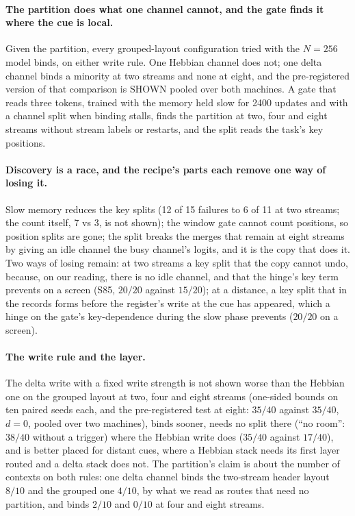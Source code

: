 \documentclass[11pt]{article}
\begin{document}
\paragraph{The partition does what one channel cannot, and the gate finds it where the cue is local.} Given the partition, every grouped-layout configuration tried with the $N = 256$ model binds, on either write rule. One Hebbian channel does not; one delta channel binds a minority at two streams and none at eight, and the pre-registered version of that comparison is SHOWN pooled over both machines. A gate that reads three tokens, trained with the memory held slow for 2400 updates and with a channel split when binding stalls, finds the partition at two, four and eight streams without stream labels or restarts, and the split reads the task's key positions.

\paragraph{Discovery is a race, and the recipe's parts each remove one way of losing it.} Slow memory reduces the key splits (12 of 15 failures to 6 of 11 at two streams; the count itself, 7 vs 3, is not shown); the window gate cannot count positions, so position splits are gone; the split breaks the merges that remain at eight streams by giving an idle channel the busy channel's logits, and it is the copy that does it. Two ways of losing remain: at two streams a key split that the copy cannot undo, because, on our reading, there is no idle channel, and that the hinge's key term prevents on a screen (S85, $20/20$ against $15/20$); at a distance, a key split that in the records forms before the register's write at the cue has appeared, which a hinge on the gate's key-dependence during the slow phase prevents ($20/20$ on a screen).

\paragraph{The write rule and the layer.} The delta write with a fixed write strength is not shown worse than the Hebbian one on the grouped layout at two, four and eight streams (one-sided bounds on ten paired seeds each, and the pre-registered test at eight: $35/40$ against $35/40$, $d = 0$, pooled over two machines), binds sooner, needs no split there (``no room'': $38/40$ without a trigger) where the Hebbian write does ($35/40$ against $17/40$), and is better placed for distant cues, where a Hebbian stack needs its first layer routed and a delta stack does not. The partition's claim is about the number of contexts on both rules: one delta channel binds the two-stream header layout $8/10$ and the grouped one $4/10$, by what we read as routes that need no partition, and binds $2/10$ and $0/10$ at four and eight streams.
\end{document}
